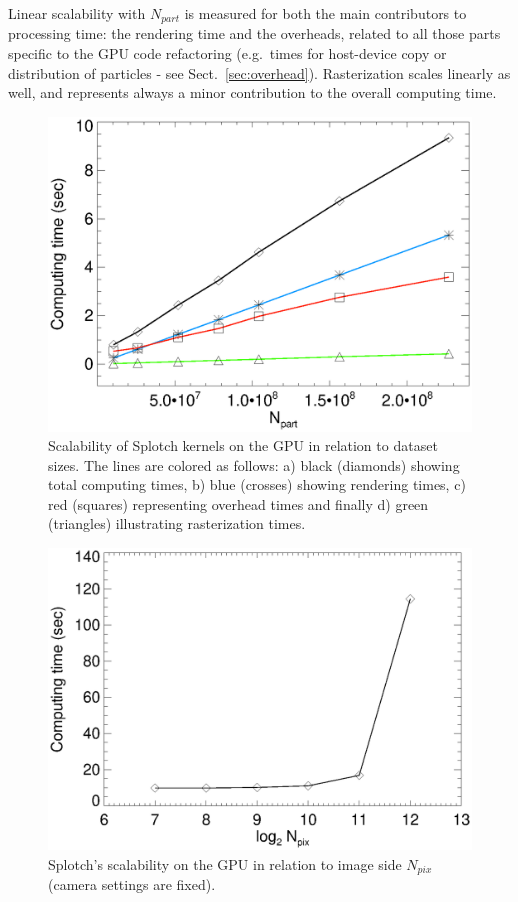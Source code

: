 \documentclass[preprint,5pt]{elsarticle}
\begin{document}
Linear scalability with $N_{part}$ is measured for both the main contributors to processing time: the rendering time and the overheads, related to all those parts specific to the GPU code refactoring (e.g.\ times for host-device copy or distribution of particles - see Sect.~\ref{sec:overhead}).
Rasterization scales linearly as well, and represents always a minor contribution to the overall computing time.   

\begin{figure}
\includegraphics[scale=0.5]{scala-fig3K20.eps}
\caption{Scalability of Splotch kernels on the GPU in relation to dataset sizes. 
The lines are colored as follows: a) black (diamonds) showing total computing times, b) blue (crosses) showing rendering times, c) red (squares) representing overhead times and finally d) green (triangles) illustrating rasterization times.}
\label{fig:scalability}
\end{figure}
 
\begin{figure}
\includegraphics[scale=0.5]{pixelsK20-fig4.eps}
\caption{Splotch's scalability on the GPU in relation to image side $N_{pix}$ (camera settings are fixed).}
\label{fig:pixels}
\end{figure}
\end{document}
